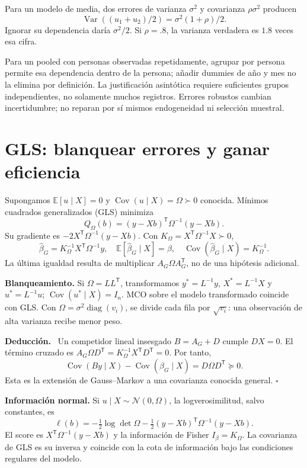 \documentclass[11pt,a4paper]{article}
\newcommand{\E}{\mathbb E}
\newcommand{\T}{^{\mathsf T}}
\DeclareMathOperator{\Var}{Var}
\DeclareMathOperator{\Cov}{Cov}
\DeclareMathOperator{\diag}{diag}
\newcommand{\Normal}{\mathcal N}
\newcommand{\topic}[2]{\clearpage\section{#1}\label{#2}}
\newenvironment{deduccion}{\par\textbf{Deducción.}\ }{\hfill$\square$\par}
\theoremstyle{definition}\newtheorem{definicion}[teorema]{Definición}
\begin{document}
\begin{ejemplo}
Para un modelo de media, dos errores de varianza $\sigma^2$ y covarianza
$\rho\sigma^2$ producen
\[
\Var((u_1+u_2)/2)=\sigma^2(1+\rho)/2.
\]
Ignorar su dependencia daría $\sigma^2/2$.
Si $\rho=.8$, la varianza verdadera es $1.8$ veces esa cifra.
\end{ejemplo}
Para un pooled con personas observadas repetidamente, agrupar por persona
permite esa dependencia dentro de la persona; añadir dummies de año y mes
no la elimina por definición.
La justificación asintótica requiere suficientes grupos independientes,
no solamente muchos registros.
Errores robustos cambian incertidumbre; no reparan por sí mismos
endogeneidad ni selección muestral.

\topic{GLS: blanquear errores y ganar eficiencia}{s40}
Supongamos $\E[u\mid X]=0$ y $\Cov(u\mid X)=\Omega\succ0$ conocida.
Mínimos cuadrados generalizados (GLS) minimiza
\[
Q_\Omega(b)=(y-Xb)\T\Omega^{-1}(y-Xb).
\]
Su gradiente es $-2X\T\Omega^{-1}(y-Xb)$.
Con $K_\Omega=X\T\Omega^{-1}X\succ0$,
\[
\boxed{\widehat\beta_G=K_\Omega^{-1}X\T\Omega^{-1}y},
\quad
\E[\widehat\beta_G\mid X]=\beta,
\quad \Cov(\widehat\beta_G\mid X)=K_\Omega^{-1}.
\]
La última igualdad resulta de multiplicar
$A_G\Omega A_G\T$, no de una hipótesis adicional.

\textbf{Blanqueamiento.}
Si $\Omega=LL\T$, transformamos $y^*=L^{-1}y$, $X^*=L^{-1}X$ y
$u^*=L^{-1}u$; $\Cov(u^*\mid X)=I_n$.
MCO sobre el modelo transformado coincide con GLS.
Con $\Omega=\sigma^2\diag(v_i)$, se divide cada fila por $\sqrt{v_i}$:
una observación de alta varianza recibe menor peso.

\begin{deduccion}
Un competidor lineal insesgado $B=A_G+D$ cumple $DX=0$.
El término cruzado es
$A_G\Omega D\T=K_\Omega^{-1}X\T D\T=0$.
Por tanto,
\[
\Cov(By\mid X)-\Cov(\widehat\beta_G\mid X)=D\Omega D\T\succeq0.
\]
Esta es la extensión de Gauss--Markov a una covarianza conocida general.
\end{deduccion}
\textbf{Información normal.}
Si $u\mid X\sim\Normal(0,\Omega)$, la logverosimilitud, salvo constantes, es
\[
\ell(b)=-\tfrac12\log\det\Omega
-\tfrac12(y-Xb)\T\Omega^{-1}(y-Xb).
\]
El score es $X\T\Omega^{-1}(y-Xb)$ y la información de Fisher
$I_\beta=K_\Omega$. La covarianza de GLS es su inversa y coincide
con la cota de información bajo las condiciones regulares del modelo.
\end{document}
